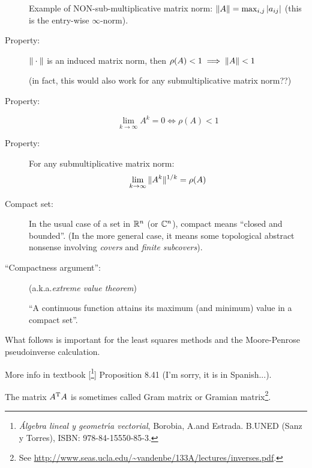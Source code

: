 \documentclass[
  12pt,
  paper=a4,
]{scrartcl} %
\begin{document}
\begin{description}
Example of NON-sub-multiplicative matrix norm: $\|A\| = \max_{i,j} |a_{ij}|$ (this is the entry-wise $\infty$-norm).

\item[Property:]
$\|\cdot\|$ is an induced matrix norm, then $\rho(A)<1\implies \|A\| < 1$

(in fact, this would also work for any submultiplicative matrix norm??)

\item[Property:]
\[
    \lim_{k\to\infty}A^k = 0 \iff \rho(A) < 1
\]

\item[Property:]
For any submultiplicative matrix norm:
\[
    \lim_{k\to\infty}\|A^k\|^{1/k} = \rho(A)
\]

\item[Compact set:]
In the usual case of a set in $\mathbb R^n$ (or $\mathbb C^n$), compact means ``closed and bounded''. (In the more general case, it means some topological abstract nonsense involving \emph{covers} and \emph{finite subcovers}).

\item[``Compactness argument'':] (a.k.a.\@ \emph{extreme value theorem})

``A continuous function attains its maximum (and minimum) value in a compact set''.


\end{description}

\newpage
{}
What follows is important for the least squares methods and the Moore-Penrose pseudoinverse calculation.

More info in textbook [\footnote{\emph{{\'A}lgebra lineal y geometr{\'\i}a vectorial}, Borobia, A.\@ and Estrada. B.\@ UNED (Sanz y Torres), ISBN: 978-84-15550-85-3.}] Proposition 8.41 (I'm sorry, it is in Spanish...).

The matrix $A^{\mathrm{T}} A$ is sometimes called Gram matrix or Gramian matrix\footnote{See \url{http://www.seas.ucla.edu/~vandenbe/133A/lectures/inverses.pdf}.}.
\end{document}
